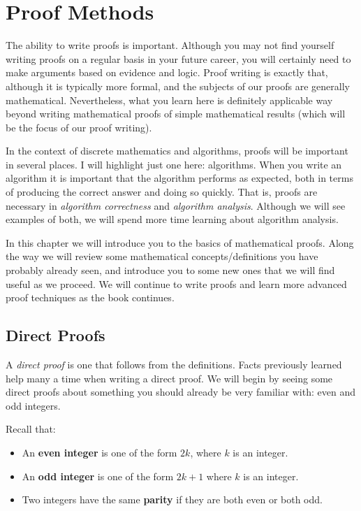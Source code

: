 \chapter{Proof Methods}\label{ch:proofs}

The ability to write proofs is important. 
Although you may not find yourself writing proofs on a regular
basis in your future career, you will certainly need to make
arguments based on evidence and logic. Proof writing is
exactly that, although it is typically more formal, and the 
subjects of our proofs are generally mathematical. Nevertheless, 
what you learn here is definitely applicable way beyond writing
mathematical proofs of simple mathematical results
(which will be the focus of our proof writing).

In the context of discrete mathematics and algorithms, 
proofs will be important in several places. I will highlight just
one here: algorithms. 
When you write an algorithm it is important that the algorithm performs as expected, both in terms of
producing the correct answer and doing so quickly.  
That is, proofs are necessary in {\em algorithm correctness} and {\em algorithm analysis}. Although we will see examples of
both, we will spend more time learning about algorithm analysis.

In this chapter we will introduce you to the basics of mathematical proofs.  Along the way we will 
review some  mathematical concepts/definitions you have probably already seen, and introduce
you to some new ones that we will find useful as we proceed.  We will continue to write proofs 
and learn more advanced proof techniques as the book continues.

\section{Direct Proofs}\label{section:dProofs}
A {\em direct proof}
is one that follows from the definitions.  
Facts previously learned help many a time when writing a direct proof.
We will begin by seeing some direct proofs about something you should already be very familiar with:
even and odd integers.

\begin{df}
Recall that:
\begin{itemize}
\item An {\bf even integer} is one of the form $2k$, where $k$ is an integer.
\item An {\bf odd integer} is one of the form $2k + 1$ where $k$ is an integer.
\item Two integers have the same {\bf parity} if they are both even or both odd.
\end{itemize}
\end{df}

